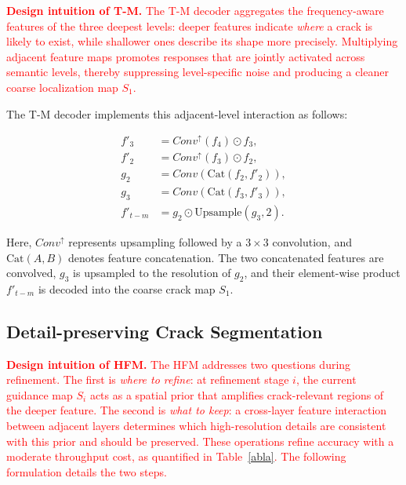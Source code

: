 \documentclass[journal]{IEEEtran}
\begin{document}
\textcolor{red}{\textbf{Design intuition of T-M.} The T-M decoder aggregates the frequency-aware features of the three deepest levels: deeper features indicate \emph{where} a crack is likely to exist, while shallower ones describe its shape more precisely. Multiplying adjacent feature maps promotes responses that are jointly activated across semantic levels, thereby suppressing level-specific noise and producing a cleaner coarse localization map $S_1$.}

The T-M decoder implements this adjacent-level interaction as follows:

\begin{equation}
\begin{split}
    f'_3 &= Conv^ {\uparrow }(f_4)   \odot f_3, \\
    f'_2 &= Conv^ {\uparrow }(f_3)   \odot f_2, \\
    g_2 &= Conv(\text{Cat}(f_2,f'_2)), \\
    g_3 &= Conv(\text{Cat}(f_3,f'_3)), \\
    f'_{t-m} &= g_2 \odot \text{Upsample}(g_3,2).
\end{split}
\end{equation}

Here, $Conv^{\uparrow}$ represents upsampling followed by a $3 \times 3$ convolution, and $\text{Cat}(A,B)$ denotes feature concatenation. The two concatenated features are convolved, $g_3$ is upsampled to the resolution of $g_2$, and their element-wise product $f'_{t-m}$ is decoded into the coarse crack map $S_1$.



\subsection{{Detail-preserving Crack Segmentation}} \label{sec:Detail-preserving-Fine-Localization}

\textcolor{red}{\textbf{Design intuition of HFM.} The HFM addresses two questions during refinement. The first is \emph{where to refine}: at refinement stage $i$, the current guidance map $S_i$ acts as a spatial prior that amplifies crack-relevant regions of the deeper feature. The second is \emph{what to keep}: a cross-layer feature interaction between adjacent layers determines which high-resolution details are consistent with this prior and should be preserved. These operations refine accuracy with a moderate throughput cost, as quantified in Table~\ref{abla}. The following formulation details the two steps.}
\end{document}
